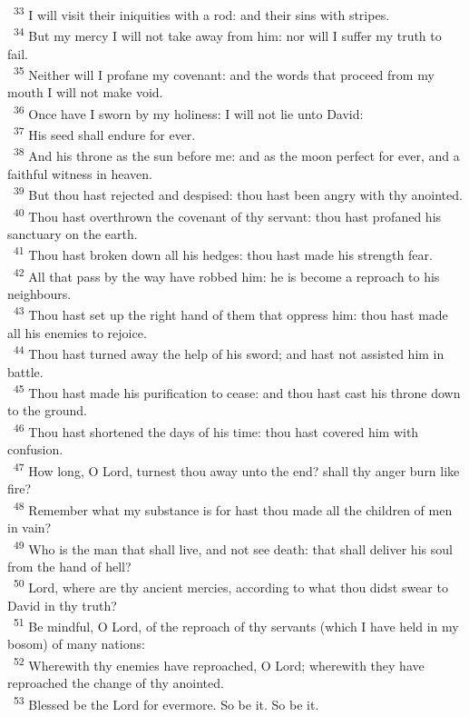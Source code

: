 \documentclass[a5paper,12pt]{article}
\begin{document}
\begin{multicols*}{2}
~\textsuperscript{33} I will visit their iniquities with a rod: and their sins with stripes.\\
~\textsuperscript{34} But my mercy I will not take away from him: nor will I suffer my truth to fail.\\
~\textsuperscript{35} Neither will I profane my covenant: and the words that proceed from my mouth I will not make void.\\
~\textsuperscript{36} Once have I sworn by my holiness: I will not lie unto David:\\
~\textsuperscript{37} His seed shall endure for ever.\\
~\textsuperscript{38} And his throne as the sun before me: and as the moon perfect for ever, and a faithful witness in heaven.\\
~\textsuperscript{39} But thou hast rejected and despised: thou hast been angry with thy anointed.\\
~\textsuperscript{40} Thou hast overthrown the covenant of thy servant: thou hast profaned his sanctuary on the earth.\\
~\textsuperscript{41} Thou hast broken down all his hedges: thou hast made his strength fear.\\
~\textsuperscript{42} All that pass by the way have robbed him: he is become a reproach to his neighbours.\\
~\textsuperscript{43} Thou hast set up the right hand of them that oppress him: thou hast made all his enemies to rejoice.\\
~\textsuperscript{44} Thou hast turned away the help of his sword; and hast not assisted him in battle.\\
~\textsuperscript{45} Thou hast made his purification to cease: and thou hast cast his throne down to the ground.\\
~\textsuperscript{46} Thou hast shortened the days of his time: thou hast covered him with confusion.\\
~\textsuperscript{47} How long, O Lord, turnest thou away unto the end? shall thy anger burn like fire?\\
~\textsuperscript{48} Remember what my substance is for hast thou made all the children of men in vain?\\
~\textsuperscript{49} Who is the man that shall live, and not see death: that shall deliver his soul from the hand of hell?\\
~\textsuperscript{50} Lord, where are thy ancient mercies, according to what thou didst swear to David in thy truth?\\
~\textsuperscript{51} Be mindful, O Lord, of the reproach of thy servants (which I have held in my bosom) of many nations:\\
~\textsuperscript{52} Wherewith thy enemies have reproached, O Lord; wherewith they have reproached the change of thy anointed.\\
~\textsuperscript{53} Blessed be the Lord for evermore. So be it. So be it.\\


\end{multicols*}
\end{document}
